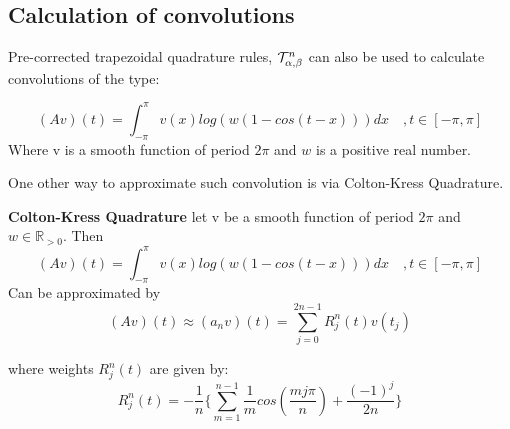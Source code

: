 \documentclass[../document.tex]{subfiles}
\begin{document}
	
	
	\subsection{Calculation of convolutions}
	
	Pre-corrected trapezoidal quadrature rules, $\mathcal{T}_{\alpha,\beta}^{n}$ can also be used to calculate convolutions of the type:
	
	$$
	(Av)(t) =     \int_{-\pi}^{\pi} v(x) log( w(1-cos(t-x)) ) dx \quad ,t \in [-\pi,\pi]
	$$
	Where v is a smooth function of period $2\pi$ and $w$ is a positive real number.
	
	
	
	
	One other way to approximate such convolution is via Colton-Kress Quadrature.
	\begin{simp_num}{\normalfont\textbf{Colton-Kress Quadrature}}
		let v be a smooth function of period $2\pi$ and $w \in \mathbb{R}_{>0}$. Then
		\begin{equation*}
			(Av)(t) =     \int_{-\pi}^{\pi} v(x) log( w(1-cos(t-x)) ) dx \quad ,t \in [-\pi,\pi]
		\end{equation*}
		Can be approximated by
		\begin{equation}
			(Av)(t) \approx  (a_nv)(t) =\sum_{j=0}^{2n-1}  \textit{R}_j^n(t) v(t_j)
		\end{equation}
		
		where weights $\textit{R}_j^n(t)$ are given by:
		\begin{equation}
			\textit{R}_j^n(t) = -\frac{1}{n}
			\Bigg\{
			\sum_{m=1}^{n-1} \frac{1}{m}
			cos(\frac{mj\pi}{n})  + \frac{(-1)^j}{2n}
			\Bigg\}
		\end{equation}
		
		
	\end{simp_num}
	
	
	
\end{document}
